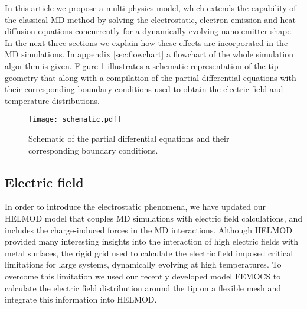 \documentclass[%
 aps,
 prb,%
 amsmath,amssymb,
reprint,%
superscriptaddress,
]{revtex4-1}
\begin{document}
In this article we propose a multi-physics model, which extends the capability of the classical MD method by solving the electrostatic, electron emission and heat diffusion equations concurrently for a dynamically evolving nano-emitter shape. 
In the next three sections we explain how these effects are incorporated in the MD simulations.
In appendix \ref{sec:flowchart} a flowchart of the whole simulation algorithm is given. 
Figure \ref{fig:schematic} illustrates a schematic representation of the tip geometry that along with a compilation of the partial differential equations with their corresponding boundary conditions used to obtain the electric field and temperature distributions.
\begin{figure}[htbp]
	\centering
    \texttt{[image: schematic.pdf]}
    \caption{Schematic of the partial differential equations and their corresponding boundary conditions.}
    \label{fig:schematic}
\end{figure}



\subsection{Electric field} \label{ssec:field}

In order to introduce the electrostatic phenomena, we have updated our HELMOD model \cite{Djurabekova2011} that couples MD simulations with electric field calculations, and includes the charge-induced forces in the MD interactions.
Although HELMOD provided many interesting insights into the interaction of high electric fields with metal surfaces, the rigid grid used to calculate the electric field imposed critical limitations for large systems, dynamically evolving at high temperatures. 
To overcome this limitation we used our recently developed model FEMOCS \cite{FemocsIVNC,VekseDynamic_arxiv} to calculate the electric field distribution around the tip on a flexible mesh and integrate this information into HELMOD.
\end{document}

